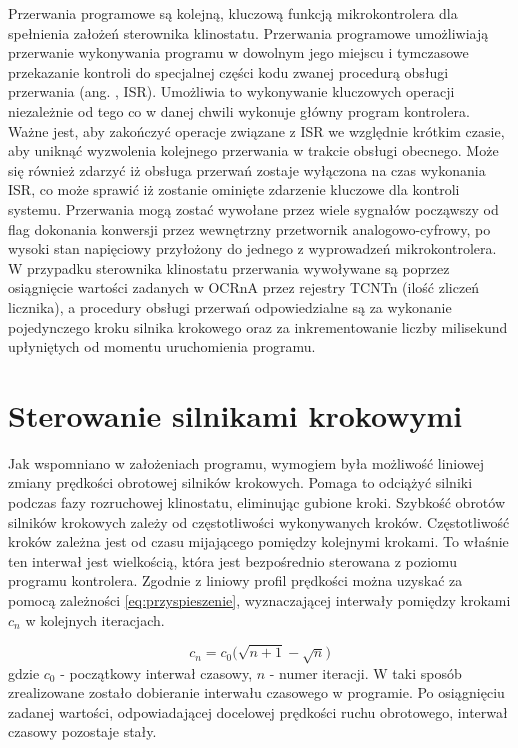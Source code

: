 Przerwania programowe są kolejną, kluczową funkcją mikrokontrolera dla spełnienia założeń sterownika klinostatu. Przerwania programowe umożliwiają przerwanie wykonywania programu w dowolnym jego miejscu i tymczasowe przekazanie kontroli do specjalnej części kodu zwanej procedurą obsługi przerwania (ang. , ISR). Umożliwia to wykonywanie kluczowych operacji niezależnie od tego co w danej chwili wykonuje główny program kontrolera. Ważne jest, aby zakończyć operacje związane z ISR we względnie krótkim czasie, aby uniknąć wyzwolenia kolejnego przerwania w trakcie obsługi obecnego. Może się również zdarzyć iż obsługa przerwań zostaje wyłączona na czas wykonania ISR, co może sprawić iż zostanie ominięte zdarzenie kluczowe dla kontroli systemu. Przerwania mogą zostać wywołane przez wiele sygnałów począwszy od flag dokonania konwersji przez wewnętrzny przetwornik analogowo-cyfrowy, po wysoki stan napięciowy przyłożony do jednego z wyprowadzeń mikrokontrolera. W przypadku sterownika klinostatu przerwania wywoływane są poprzez osiągnięcie wartości zadanych w OCRnA przez rejestry TCNTn (ilość zliczeń licznika), a procedury obsługi przerwań odpowiedzialne są za wykonanie pojedynczego kroku silnika krokowego oraz za inkrementowanie liczby milisekund upłyniętych od momentu uruchomienia programu.

\section{Sterowanie silnikami krokowymi}

Jak wspomniano w założeniach programu, wymogiem była możliwość liniowej zmiany prędkości obrotowej silników krokowych. Pomaga to odciążyć silniki podczas fazy rozruchowej klinostatu, eliminując gubione kroki. Szybkość obrotów silników krokowych zależy od częstotliwości wykonywanych kroków. Częstotliwość kroków zależna jest od czasu mijającego pomiędzy kolejnymi krokami. To właśnie ten interwał jest wielkością, która jest bezpośrednio sterowana z poziomu programu kontrolera. Zgodnie z \cite{bib:krokowe_przyspieszenie} liniowy profil prędkości można uzyskać za pomocą zależności \ref{eq:przyspieszenie}, wyznaczającej interwały pomiędzy krokami $c_n$ w kolejnych iteracjach.

\begin{equation}\label{eq:przyspieszenie}
	c_n = c_0 \big(\sqrt{n+1} - \sqrt{n} \big)
\end{equation}
gdzie $c_0$ - początkowy interwał czasowy, $n$ - numer iteracji. W taki sposób zrealizowane zostało dobieranie interwału czasowego w programie. Po osiągnięciu zadanej wartości, odpowiadającej docelowej prędkości ruchu obrotowego, interwał czasowy pozostaje stały.


